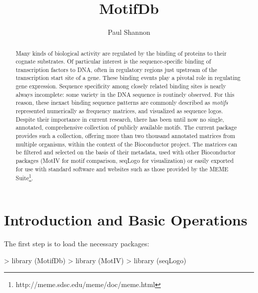 \documentclass{article}
\title{MotifDb}
\author{Paul Shannon}
\renewenvironment{Schunk}{\vspace{\topsep}}{\vspace{\topsep}}
\begin{document}
\maketitle
\begin{abstract}
Many kinds of biological activity are regulated by the binding of proteins to their cognate
substrates.  Of particular interest is the sequence-specific binding of transcription factors to DNA, often in
regulatory regions just upstream of the transcription start site of a gene.  These binding events play a pivotal
role in regulating gene expression.  Sequence specificity among closely related binding sites is nearly always incomplete: some variety
in the DNA sequence is routinely observed.  For this reason, these inexact binding sequence patterns are commonly
described as \emph{motifs} represented numerically as frequency matrices, and visualized as sequence logos.  Despite their importance
in current research, there has been until now no single, annotated, comprehensive collection of publicly available motifs.
The current package provides such a collection, offering more than two thousand annotated matrices from multiple organisms, within the
context of the Bioconductor project.  The matrices can be filtered and selected on the basis of their metadata, used with other
Bioconductor packages (MotIV for motif comparison, seqLogo for visualization) or easily exported for use with
standard software and websites such as those provided by the MEME Suite\footnote{http://meme.sdsc.edu/meme/doc/meme.html}.
\end{abstract}

\tableofcontents

\section{Introduction and Basic Operations}

The first step is to load the necessary packages:

\begin{Schunk}
\begin{Sinput}
> library (MotifDb)
> library (MotIV)
> library (seqLogo)
\end{Sinput}
\end{Schunk}
\end{document}
